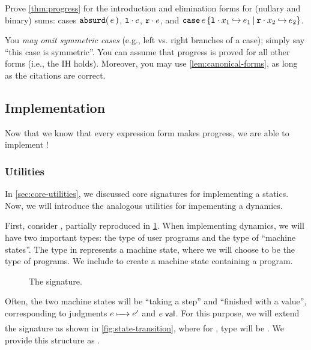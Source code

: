 \documentclass[11pt]{article}
\begin{document}
\begin{task}{25}
  Prove \cref{thm:progress} for the introduction and elimination forms for (nullary and binary) sums:
  cases $\absurdexcst{\tau}{e}$, $\inlexcst{\tau_2}{e}$, $\inrexcst{\tau_1}{e}$, and $\caseexcst{e}{x_1}{\tau_1}{e_1}{x_2}{\tau_2}{e_2}$.

  You \emph{may omit symmetric cases} (e.g., left vs. right branches of a case); simply say ``this case is symmetric''.
  You can assume that progress is proved for all other forms (i.e., the IH holds).
  Moreover, you may use \cref{lem:canonical-forms}, as long as the citations are correct.
\end{task}


\subsection{Implementation}

Now that we know that every expression form makes progress, we are able to implement \LangPSF{}!

\subsubsection[core/ Utilities]{ Utilities}

In \cref{sec:core-utilities}, we discussed core signatures for implementing a statics.
Now, we will introduce the analogous utilities for impementing a dynamics.

First, consider , partially reproduced in \cref{fig:dynamics}.
When implementing dynamics, we will have two important types: the type of user programs and the type of ``machine states''.
The type  in  represents a machine state, where we will choose  to be the type of programs.
We include  to create a machine state containing a program.

\begin{figure}
  \caption{The  signature.}
  \label{fig:dynamics}
\end{figure}

Often, the two machine states will be ``taking a step'' and ``finished with a value'', corresponding to judgments $e \StepsTo e'$ and $\IsVal{e}$.
For this purpose, we will extend the signature as shown in \cref{fig:state-transition}, where for \LangPSF{}, type  will be .
We provide this structure as .
\end{document}
